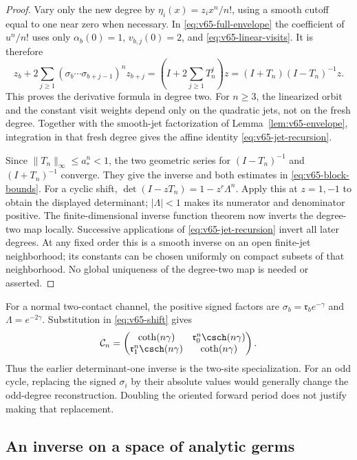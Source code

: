 \begin{proof}
Vary only the new degree by $\eta_i(x)=z_i x^n/n!$, using a smooth
cutoff equal to one near zero when necessary.  In
\eqref{eq:v65-full-envelope} the coefficient of $u^n/n!$ uses only
$\alpha_b(0)=1$, $v_{b,j}(0)=2$, and
\eqref{eq:v65-linear-visits}.  It is therefore
\[
 z_b+2\sum_{j\ge1}
   (\sigma_b\cdots\sigma_{b+j-1})^n z_{b+j}
   =\left(I+2\sum_{j\ge1}T_n^j\right)z
   =(I+T_n)(I-T_n)^{-1}z.
\]
This proves the derivative formula in degree two.  For $n\ge3$, the
linearized orbit and the constant visit weights depend only on the
quadratic jets, not on the fresh degree.  Together with the smooth-jet
factorization of Lemma~\ref{lem:v65-envelope}, integration in that
fresh degree gives the affine identity
\eqref{eq:v65-jet-recursion}.

Since $\|T_n\|_\infty\le a_*^n<1$, the two geometric series for
$(I-T_n)^{-1}$ and $(I+T_n)^{-1}$ converge.  They give the inverse
and both estimates in \eqref{eq:v65-block-bounds}.  For a cyclic shift,
$\det(I-zT_n)=1-z^r\Lambda^n$.  Apply this at $z=1,-1$ to
obtain the displayed determinant; $|\Lambda|<1$ makes its numerator
and denominator positive.  The finite-dimensional inverse function
theorem now inverts the degree-two map locally.  Successive applications
of \eqref{eq:v65-jet-recursion} invert all later degrees.  At any fixed
order this is a smooth inverse on an open finite-jet neighborhood; its
constants can be chosen uniformly on compact subsets of that neighborhood.
No global uniqueness of the degree-two map is needed or asserted.
\end{proof}

For a normal two-contact channel, the positive signed factors are
$\sigma_b=\mathfrak r_b e^{-\gamma}$ and
$\Lambda=e^{-2\gamma}$.  Substitution in \eqref{eq:v65-shift} gives
\[
 \mathcal C_n=
 \begin{pmatrix}
 \coth(n\gamma)&\mathfrak r_0^n\csch(n\gamma)\\
 \mathfrak r_1^n\csch(n\gamma)&\coth(n\gamma)
 \end{pmatrix}.
\]
Thus the earlier determinant-one inverse is the two-site specialization.
For an odd cycle, replacing the signed $\sigma_i$ by their absolute
values would generally change the odd-degree reconstruction.  Doubling
the oriented forward period does not justify making that replacement.

\subsection{An inverse on a space of analytic germs}

